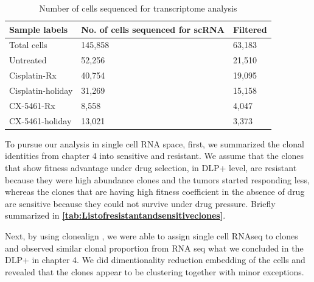 \begin{table}[htbp]
 \centering
  \caption{Number of cells sequenced for transcriptome analysis}
{
\begin{tabular}{|l|l|l|}
\hline
Sample labels     & No. of cells sequenced for scRNA & Filtered \\
\hline
Total cells          & 145,858                          & 63,183\\
Untreated         & 52,256                           & 21,510    \\
Cisplatin-Rx      & 40,754                           & 19,095    \\
Cisplatin-holiday & 31,269                           & 15,158    \\
CX-5461-Rx        & 8,558                            & 4,047     \\
CX-5461-holiday   & 13,021                           & 3,373  \\  
\hline
\end{tabular}%
\label{tab:nofcellsRNA}
}
\end{table}

To pursue our analysis in single cell RNA space, first, we summarized the clonal identities from chapter 4 into sensitive and resistant. We assume that the clones that show fitness advantage under drug selection, in DLP+ level, are resistant because they were high abundance clones and the tumors started responding less, whereas the clones that are having high fitness coefficient in the absence of drug are sensitive because they could not survive under drug pressure. Briefly summarized in  \textbf{\autoref{tab:Listofresistantandsensitiveclones}}.
 
Next, by using clonealign \cite{campbell2019clonealign}, we were able to assign single cell RNAseq to clones and observed similar clonal proportion from RNA seq what we concluded in the DLP+ in chapter 4. 
We did dimentionality reduction embedding of the cells and revealed that the clones appear to be clustering together with minor exceptions. 

